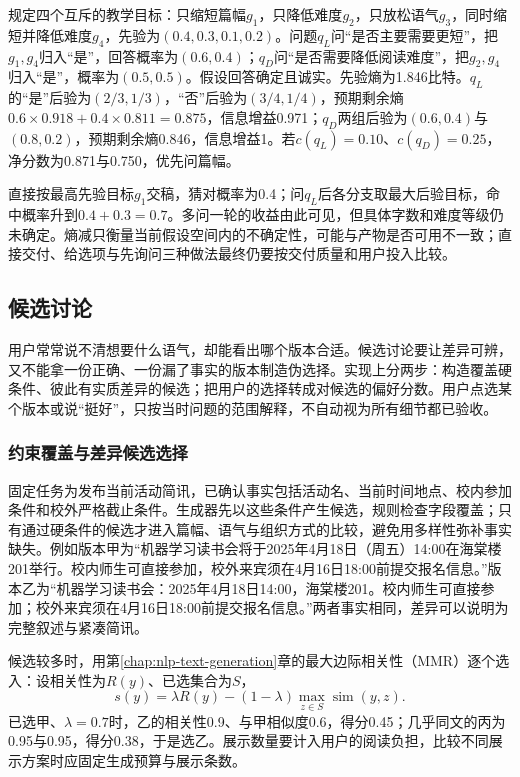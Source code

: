 规定四个互斥的教学目标：只缩短篇幅$g_1$，只降低难度$g_2$，只放松语气$g_3$，同时缩短并降低难度$g_4$，先验为$(0.4,0.3,0.1,0.2)$。问题$q_L$问“是否主要需要更短”，把$g_1,g_4$归入“是”，回答概率为$(0.6,0.4)$；$q_D$问“是否需要降低阅读难度”，把$g_2,g_4$归入“是”，概率为$(0.5,0.5)$。假设回答确定且诚实。先验熵为1.846比特。$q_L$的“是”后验为$(2/3,1/3)$，“否”后验为$(3/4,1/4)$，预期剩余熵$0.6\times0.918+0.4\times0.811=0.875$，信息增益0.971；$q_D$两组后验为$(0.6,0.4)$与$(0.8,0.2)$，预期剩余熵0.846，信息增益1。若$c(q_L)=0.10$、$c(q_D)=0.25$，净分数为0.871与0.750，优先问篇幅。

直接按最高先验目标$g_1$交稿，猜对概率为0.4；问$q_L$后各分支取最大后验目标，命中概率升到$0.4+0.3=0.7$。多问一轮的收益由此可见，但具体字数和难度等级仍未确定。熵减只衡量当前假设空间内的不确定性，可能与产物是否可用不一致；直接交付、给选项与先询问三种做法最终仍要按交付质量和用户投入比较。

\subsection{候选讨论}
\label{sec:nlp-dialogue-candidates}

用户常常说不清想要什么语气，却能看出哪个版本合适。候选讨论要让差异可辨，又不能拿一份正确、一份漏了事实的版本制造伪选择。实现上分两步：构造覆盖硬条件、彼此有实质差异的候选；把用户的选择转成对候选的偏好分数。用户点选某个版本或说“挺好”，只按当时问题的范围解释，不自动视为所有细节都已验收。

\subsubsection{约束覆盖与差异候选选择}
\label{sec:nlp-dialogue-diverse-candidates}

固定任务为发布当前活动简讯，已确认事实包括活动名、当前时间地点、校内参加条件和校外严格截止条件。生成器先以这些条件产生候选，规则检查字段覆盖；只有通过硬条件的候选才进入篇幅、语气与组织方式的比较，避免用多样性弥补事实缺失。例如版本甲为“机器学习读书会将于2025年4月18日（周五）14:00在海棠楼201举行。校内师生可直接参加，校外来宾须在4月16日18:00前提交报名信息。”版本乙为“机器学习读书会：2025年4月18日14:00，海棠楼201。校内师生可直接参加；校外来宾须在4月16日18:00前提交报名信息。”两者事实相同，差异可以说明为完整叙述与紧凑简讯。

候选较多时，用第\ref{chap:nlp-text-generation}章的最大边际相关性（MMR）逐个选入：设相关性为$R(y)$、已选集合为$S$，
\begin{equation}
 s(y)=\lambda R(y)-(1-\lambda)\max_{z\in S}\operatorname{sim}(y,z).
 \label{eq:nlp-dialogue-mmr}
\end{equation}
已选甲、$\lambda=0.7$时，乙的相关性0.9、与甲相似度0.6，得分0.45；几乎同文的丙为0.95与0.95，得分0.38，于是选乙。展示数量要计入用户的阅读负担，比较不同展示方案时应固定生成预算与展示条数。

